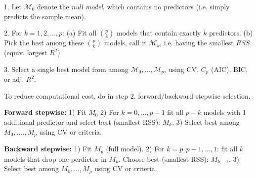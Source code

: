 1. Let $\mathcal{M}_0$ denote the \textit{null model}, which contains no predictors (i.e. simply predicts the sample mean).

2. For $k=1,2,...,p$: (a) Fit all $\binom{p}{k}$ models that contain exactly $k$ predictors. (b) Pick the best among these $\binom{p}{k}$ models, call it $\mathcal{M}_k$, i.e. having the smallest $RSS$ (equiv. largest $R^2$)

3. Select a single best model from among $\mathcal{M}_0,..., \mathcal{M}_p$, using CV, $C_p$ (AIC), BIC, or adj. $R^2$.

To reduce computational cost, do in step 2. forward/backward stepwise selection.

\textbf{Forward stepwise:} 1) Fit $M_0$ 2) For $k=0,...,p-1$ fit all $p-k$ models with 1 additional predictor and select best (smallest RSS): $M_k$. 3) Select best among $M_0,....,M_p$ using CV or criteria.

\textbf{Backward stepwise:} 1) Fit $M_p$ (full model). 2) For $k=p,p-1,...,1$: fit all $k$ models that drop one perdictor in $M_k$. Choose best (smallest RSS): $M_{k-1}$. 3) Select best among $M_0,...,M_p$ using CV or criteria.

